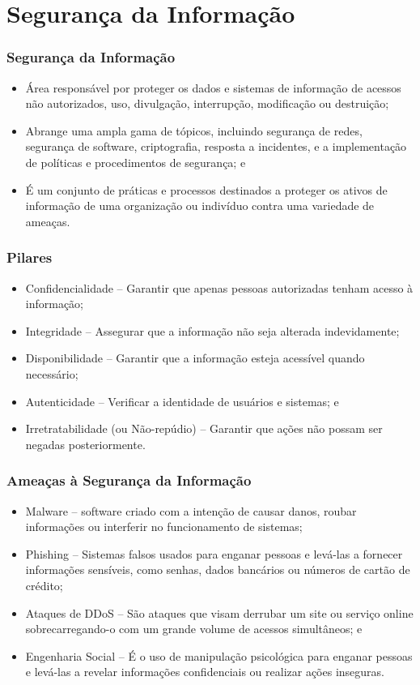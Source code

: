 \documentclass[aspectratio=169]{beamer} %
\begin{document}
\section{Segurança da Informação}

\begin{frame}
	\frametitle{Segurança da Informação}
	
	\begin{itemize}
		\item Área responsável por proteger os dados e sistemas de informação de acessos não autorizados, uso, divulgação, interrupção, modificação ou destruição;
		\item Abrange uma ampla gama de tópicos, incluindo segurança de redes, segurança de software, criptografia, resposta a incidentes, e a implementação de políticas e procedimentos de segurança; e
		\item É um conjunto de práticas e processos destinados a proteger os ativos de informação de uma organização ou indivíduo contra uma variedade de ameaças.
	\end{itemize}
\end{frame}

\begin{frame}
	\frametitle{Pilares}

	\begin{itemize}
		\item Confidencialidade -- Garantir que apenas pessoas autorizadas tenham acesso à informação;
		\item Integridade -- Assegurar que a informação não seja alterada indevidamente;
		\item Disponibilidade -- Garantir que a informação esteja acessível quando necessário;
		\item Autenticidade -- Verificar a identidade de usuários e sistemas; e
		\item Irretratabilidade (ou Não-repúdio) -- Garantir que ações não possam ser negadas posteriormente.
	\end{itemize}
\end{frame}

\begin{frame}
	\frametitle{Ameaças à Segurança da Informação}
	
	\begin{itemize}
		\item Malware -- software criado com a intenção de causar danos, roubar informações ou interferir no funcionamento de sistemas;
		\item Phishing -- Sistemas falsos usados para enganar pessoas e levá-las a fornecer informações sensíveis, como senhas, dados bancários ou números de cartão de crédito;
		\item Ataques de DDoS -- São ataques que visam derrubar um site ou serviço online sobrecarregando-o com um grande volume de acessos simultâneos; e
		\item Engenharia Social -- É o uso de manipulação psicológica para enganar pessoas e levá-las a revelar informações confidenciais ou realizar ações inseguras.
	\end{itemize}
\end{frame}
\end{document}
